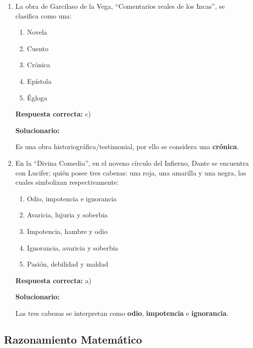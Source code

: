 \begin{enumerate}[resume]

\item  La obra de Garcilaso de la Vega, ``Comentarios reales de los Incas'', se clasifica como una:
\begin{enumerate}[label=\alph*)]
	\item Novela
	\item Cuento
	\item Crónica
	\item Epístola
	\item Égloga
\end{enumerate}

\textbf{Respuesta correcta:} c)

\vspace{2mm}
\textbf{Solucionario:}

Es una obra historiográfica/testimonial, por ello se considera una \textbf{crónica}.

\item  En la ``Divina Comedia'', en el noveno círculo del Infierno, Dante se encuentra con Lucifer; quién posee tres cabezas: una roja, una amarilla y una negra, las cuales simbolizan respectivamente:
\begin{enumerate}[label=\alph*)]
	\item Odio, impotencia e ignorancia
	\item Avaricia, lujuria y soberbia
	\item Impotencia, hambre y odio
	\item Ignorancia, avaricia y soberbia
	\item Pasión, debilidad y maldad
\end{enumerate}

\textbf{Respuesta correcta:} a)

\vspace{2mm}
\textbf{Solucionario:}

Las tres cabezas se interpretan como \textbf{odio}, \textbf{impotencia} e \textbf{ignorancia}.
\end{enumerate}


\subsection*{Razonamiento Matemático}


